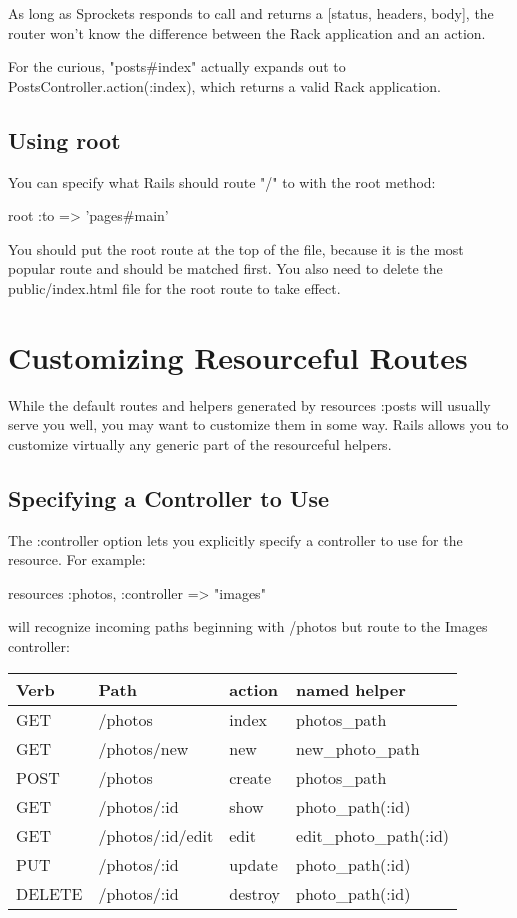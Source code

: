 \documentclass[10pt]{book}
\newenvironment{code}{%
  \scriptsize
    \verbatim
}{%
    \endverbatim
    \newline
}
\begin{document}
As long as Sprockets responds to call and returns a [status, headers, body], the router won’t know the difference between the Rack application and an action.

For the curious, "posts\#index" actually expands out to PostsController.action(:index), which returns a valid Rack application.

\subsection{ Using root}

You can specify what Rails should route "/" to with the root method:
\begin{code}
root :to => 'pages#main'
\end{code}

You should put the root route at the top of the file, because it is the most popular route and should be matched first. You also need to delete the public/index.html file for the root route to take effect.

\section{ Customizing Resourceful Routes}

While the default routes and helpers generated by resources :posts  will usually serve you well, you may want to customize them in some  way. Rails allows you to customize virtually any generic part of the  resourceful helpers.

\subsection{ Specifying a Controller to Use}

The :controller option lets you explicitly specify a controller to use for the resource. For example:
\begin{code}
resources :photos, :controller => "images"
\end{code}

will recognize incoming paths beginning with /photos but route to the Images controller:\\

\noindent
\begin{tabular}{l|p{}|l|p{}}
\hline
\textbf{Verb } & \textbf{Path} & \textbf{action } & \textbf{named helper} \\ 
\hline
GET & /photos           & index     &  photos\_path           \\ 
GET & /photos/new       & new       &  new\_photo\_path        \\ 
POST & /photos           & create    &  photos\_path           \\ 
GET & /photos/:id       & show      &  photo\_path(:id)       \\ 
GET & /photos/:id/edit  & edit      &  edit\_photo\_path(:id)  \\ 
PUT & /photos/:id       & update    &  photo\_path(:id)       \\ 
DELETE & /photos/:id       & destroy   &  photo\_path(:id)      
\end{tabular}\\
\end{document}
